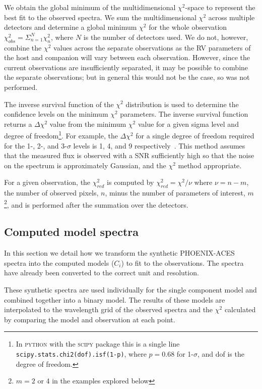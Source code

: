 \documentclass[fleqn,usenatbib]{mnras}
\begin{document}
We obtain the global minimum of the multidimensional \(\chi^{2}\)-space to represent the best fit to the observed spectra. We sum the multidimensional \(\chi^{2}\) across multiple detectors and determine a global minimum \(\chi^{2}\) for the whole observation \(\chi^{2}_{obs} = \Sigma^{N}_{n=1} \chi^{2}_n\), where \(N\) is the number of detectors used. We do not, however, combine the \(\chi^{2}\) values across the separate observations as the RV parameters of the host and companion will vary between each observation. However, since the current observations are insufficiently separated, it may be possible to combine the separate observations; but in general this would not be the case, so was not performed.

The inverse survival function of the \(\chi^2\) distribution is used to determine the confidence levels on the minimum \(\chi^2\) parameters. The inverse survival function returns a \(\Delta\chi^2\) value from the minimum \(\chi^2\) value for a given sigma level and degree of freedom\footnote{In \textsc{python} with the \textsc{scipy} package this is a single line \texttt{scipy.stats.chi2(dof).isf(1-p)}, where \(p = 0.68\) for 1-\(\sigma\), and dof is the degree of freedom.}.
For example, the \(\Delta \chi^2\) for a single degree of freedom required for the 1-, 2-, and 3-\(\sigma\) levels is 1, 4, and 9 respectively~\citep{bevington_data_2003}. This method assumes that the measured flux is observed with a SNR sufficiently high so that the noise on the spectrum is approximately Gaussian, and the \(\chi^2\) method appropriate.

For a given observation, the \(\chi^{2}_{red}\) is computed by \(\chi^2_{red} = \chi^2 / \nu\) where \(\nu = n - m\), the number of observed pixels, \(n\), minus the number of parameters of interest, \(m\)\footnote{\(m=2\) or 4 in the examples explored below}, and is performed after the summation over the detectors.

\subsection{Computed model spectra}
\label{models}
In this section we detail how we transform the synthetic PHOENIX-ACES spectra into the computed models (\(C_i\)) to fit to the observations. The spectra have already been converted to the correct unit and resolution.

These synthetic spectra are used individually for the single component model and combined together into a binary model. The results of these models are interpolated to the wavelength grid of the observed spectra and the \(\chi^{2}\) calculated by comparing the model and observation at each point.
\end{document}
